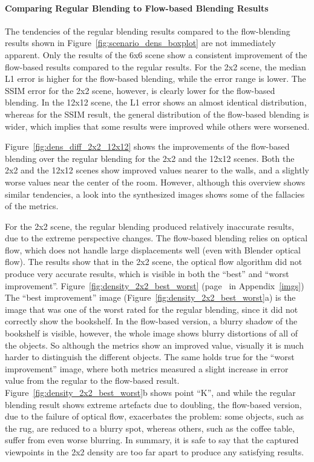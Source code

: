 \paragraph{Comparing Regular Blending to Flow-based Blending Results}
The tendencies of the regular blending results compared to the flow-blending results shown in Figure~\ref{fig:scenario_dens_boxplot} are not immediately apparent. Only the results of the 6x6 scene show a consistent improvement of the flow-based results compared to the regular results. For the 2x2 scene, the median L1 error is higher for the flow-based blending, while the error range is lower. The SSIM error for the 2x2 scene, however, is clearly lower for the flow-based blending. In the 12x12 scene, the L1 error shows an almost identical distribution, whereas for the SSIM result, the general distribution of the flow-based blending is wider, which implies that some results were improved while others were worsened.

Figure~\ref{fig:dens_diff_2x2_12x12} shows the improvements of the flow-based blending over the regular blending for the 2x2 and the 12x12 scenes. Both the 2x2 and the 12x12 scenes show improved values nearer to the walls, and a slightly worse values near the center of the room. However, although this overview shows similar tendencies, a look into the synthesized images shows some of the fallacies of the metrics. 

For the 2x2 scene, the regular blending produced relatively inaccurate results, due to the extreme perspective changes. The flow-based blending relies on optical flow, which does not handle large displacements well (even with Blender optical flow). The results show that in the 2x2 scene, the optical flow algorithm did not produce very accurate results, which is visible in both the ``best'' and ``worst improvement''. Figure~\ref{fig:density_2x2_best_worst} (page~\pageref{fig:density_2x2_best_worst} in Appendix~\ref{imgs}) The ``best improvement'' image (Figure~\ref{fig:density_2x2_best_worst}a) is the image that was one of the worst rated for the regular blending, since it did not correctly show the bookshelf. In the flow-based version, a blurry shadow of the bookshelf is visible, however, the whole image shows blurry distortions of all of the objects. So although the metrics show an improved value, visually it is much harder to distinguish the different objects. The same holds true for the ``worst improvement'' image, where both metrics measured a slight increase in error value from the regular to the flow-based result. Figure~\ref{fig:density_2x2_best_worst}b shows point ``K'', and while the regular blending result shows extreme artefacts due to doubling, the flow-based version, due to the failure of optical flow, exacerbates the problem: some objects, such as the rug, are reduced to a blurry spot, whereas others, such as the coffee table, suffer from even worse blurring. In summary, it is safe to say that the captured viewpoints in the 2x2 density are too far apart to produce any satisfying results.

